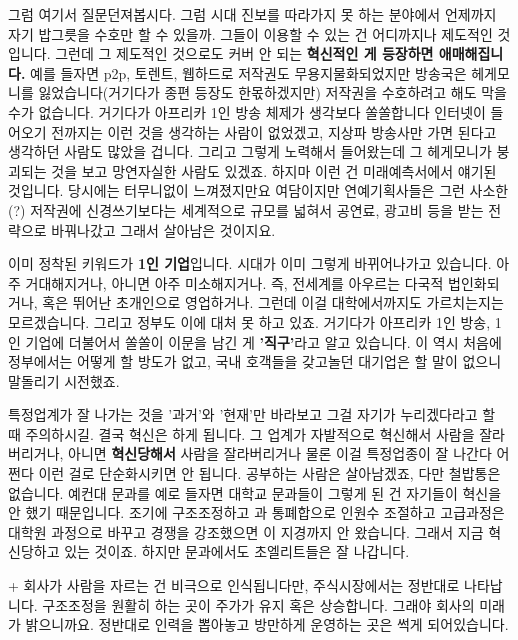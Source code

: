 그럼 여기서 질문던져봅시다. 그럼 시대 진보를 따라가지 못 하는 분야에서 언제까지 자기 밥그릇을 수호만 할 수 있을까.
그들이 이용할 수 있는 건 어디까지나 제도적인 것입니다. 그런데 그 제도적인 것으로도 커버 안 되는 \textbf{혁신적인 게 등장하면 애매해집니다.}
예를 들자면 p2p, 토렌트, 웹하드로 저작권도 무용지물화되었지만 방송국은 헤게모니를 잃었습니다(거기다가 종편 등장도 한몫하겠지만)
저작권을 수호하려고 해도 막을 수가 없습니다. 거기다가 아프리카 1인 방송 체제가 생각보다 쏠쏠합니다
인터넷이 들어오기 전까지는 이런 것을 생각하는 사람이 없었겠고, 지상파 방송사만 가면 된다고 생각하던 사람도 많았을 겁니다.
그리고 그렇게 노력해서 들어왔는데 그 헤게모니가 붕괴되는 것을 보고 망연자실한 사람도 있겠죠.
하지마 이런 건 미래예측서에서 얘기된 것입니다. 당시에는 터무니없이 느껴졌지만요
여담이지만 연예기획사들은 그런 사소한(?) 저작권에 신경쓰기보다는
세계적으로 규모를 넓혀서 공연료, 광고비 등을 받는 전략으로 바꿔나갔고 그래서 살아남은 것이지요.
\vspace{5mm}

이미 정착된 키워드가 \textbf{1인 기업}입니다. 시대가 이미 그렇게 바뀌어나가고 있습니다.
아주 거대해지거나, 아니면 아주 미소해지거나. 즉, 전세계를 아우르는 다국적 법인화되거나, 혹은 뛰어난 초개인으로 영업하거나.
그런데 이걸 대학에서까지도 가르치는지는 모르겠습니다. 그리고 정부도 이에 대처 못 하고 있죠.
거기다가 아프리카 1인 방송, 1인 기업에 더불어서 쏠쏠이 이문을 남긴 게 \textbf{'직구'}라고 알고 있습니다.
이 역시 처음에 정부에서는 어떻게 할 방도가 없고, 국내 호객들을 갖고놀던 대기업은 할 말이 없으니 말돌리기 시전했죠.
\vspace{5mm}

특정업계가 잘 나가는 것을 '과거'와 '현재'만 바라보고 그걸 자기가 누리겠다라고 할 때 주의하시길.
결국 혁신은 하게 됩니다. 그 업계가 자발적으로 혁신해서 사람을 잘라버리거나, 아니면 \textbf{혁신당해서} 사람을 잘라버리거나
물론 이걸 특정업종이 잘 나간다 어쩐다 이런 걸로 단순화시키면 안 됩니다. 공부하는 사람은 살아남겠죠, 다만 철밥통은 없습니다.
예컨대 문과를 예로 들자면 대학교 문과들이 그렇게 된 건 자기들이 혁신을 안 했기 때문입니다.
조기에 구조조정하고 과 통폐합으로 인원수 조절하고 고급과정은 대학원 과정으로 바꾸고 경쟁을 강조했으면 이 지경까지 안 왔습니다.
그래서 지금 혁신당하고 있는 것이죠. 하지만 문과에서도 초엘리트들은 잘 나갑니다.
\vspace{5mm}

+
회사가 사람을 자르는 건 비극으로 인식됩니다만, 주식시장에서는 정반대로 나타납니다.
구조조정을 원활히 하는 곳이 주가가 유지 혹은 상승합니다. 그래야 회사의 미래가 밝으니까요.
정반대로 인력을 뽑아놓고 방만하게 운영하는 곳은 썩게 되어있습니다.
\vspace{5mm}






